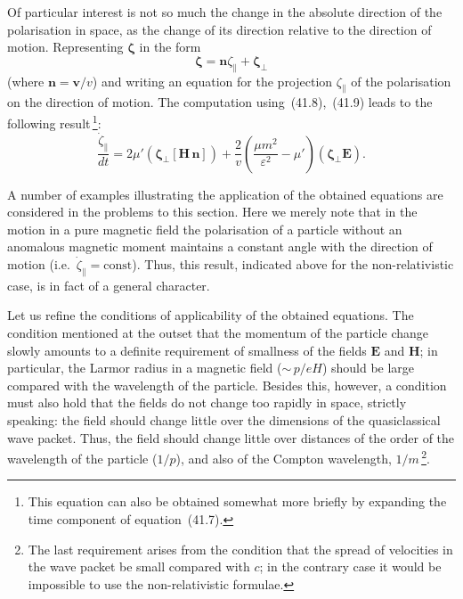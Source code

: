 Of particular interest is not so much the change in the absolute direction of the polarisation in space, as the change of its direction relative to the direction of motion. Representing $\boldsymbol{\zeta}$ in the form
\begin{equation}
\boldsymbol{\zeta} = \mathbf{n}\zeta_\parallel + \boldsymbol{\zeta}_\perp
\tag{41.10}
\end{equation}
(where $\mathbf{n} = \mathbf{v}/v$) and writing an equation for the projection $\zeta_\parallel$ of the polarisation on the direction of motion. The computation using~(41.8),~(41.9) leads to the following result\,\footnote{This equation can also be obtained somewhat more briefly by expanding the time component of equation~(41.7).}:
\begin{equation}
\frac{\dot\zeta_\parallel}{dt} = 2\mu'(\boldsymbol{\zeta}_\perp[\mathbf{H}\,\mathbf{n}]) + \frac{2}{v}\!\left(\frac{\mu m^2}{\varepsilon^2} - \mu'\right)\!(\boldsymbol{\zeta}_\perp\mathbf{E}).
\tag{41.11}
\end{equation}

A number of examples illustrating the application of the obtained equations are considered in the problems to this section. Here we merely note that in the motion in a pure magnetic field the polarisation of a particle without an anomalous magnetic moment maintains a constant angle with the direction of motion (i.e.\ $\dot\zeta_\parallel = \mathrm{const}$). Thus, this result, indicated above for the non-relativistic case, is in fact of a general character.

Let us refine the conditions of applicability of the obtained equations. The condition mentioned at the outset that the momentum of the particle change slowly amounts to a definite requirement of smallness of the fields $\mathbf{E}$ and $\mathbf{H}$; in particular, the Larmor radius in a magnetic field (${\sim}\,p/eH$) should be large compared with the wavelength of the particle. Besides this, however, a condition must also hold that the fields do not change too rapidly in space, strictly speaking: the field should change little over the dimensions of the quasiclassical wave packet. Thus, the field should change little over distances of the order of the wavelength of the particle ($1/p$), and also of the Compton wavelength, $1/m$\,\footnote{The last requirement arises from the condition that the spread of velocities in the wave packet be small compared with $c$; in the contrary case it would be impossible to use the non-relativistic formulae.}.

